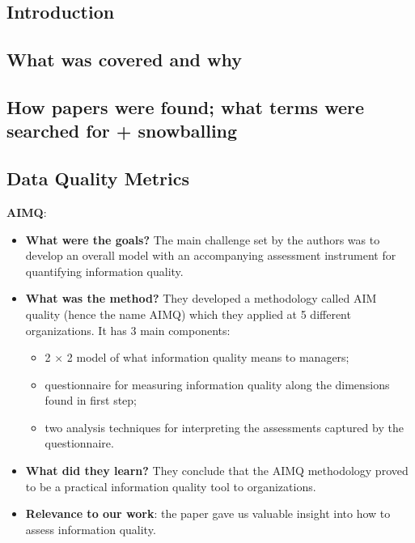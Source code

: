 \documentclass{mprop}
\begin{document}
\subsection{Introduction}

\subsection{What was covered and why}

\subsection{How papers were found; what terms were searched for + snowballing}

\subsection{Data Quality Metrics}

 \textbf{AIMQ}\cite{lee2002aimq}:
 \begin{itemize}
   \item \textbf{What were the goals?}
     The main challenge set by the authors was to develop an overall model
     with an accompanying assessment instrument for quantifying information
     quality.
   \item \textbf{What was the method?}
     They developed a methodology called AIM quality (hence the name AIMQ) which
     they applied at 5 different organizations. It has 3 main components:
      \begin{itemize}
        \item 2 $\times$ 2 model of what information quality means to managers;
        \item questionnaire for measuring information quality along the dimensions
          found in first step;
        \item two analysis techniques for interpreting the assessments captured 
          by the questionnaire.
      \end{itemize} 
   \item \textbf{What did they learn?}
      They conclude that the AIMQ methodology proved to be a practical information
      quality tool to organizations.
   \item \textbf{Relevance to our work}: the paper gave us valuable insight into 
     how to assess information quality.
\end{itemize}
\end{document}
